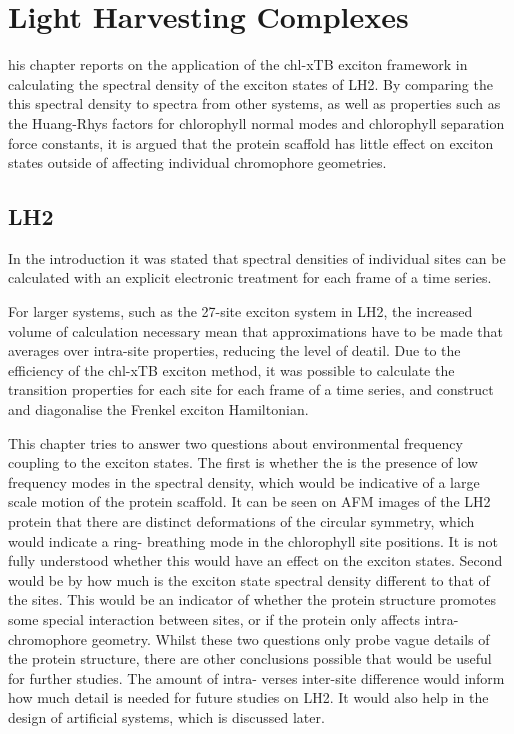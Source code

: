 %
%
\let\textcircled=\pgftextcircled
\chapter{Light Harvesting Complexes}
\label{chap:LH2}

his chapter reports on the application of the chl-xTB exciton framework
in calculating the spectral density of the exciton states of LH2. By comparing the
this spectral density to spectra from other systems, as well as properties such
as the Huang-Rhys factors for chlorophyll normal modes and chlorophyll separation
force constants, it is argued that the protein scaffold has little effect on exciton
states outside of affecting individual chromophore geometries.

\section{LH2}
\label{sec:LH2}

In the introduction it was stated that spectral densities of individual sites can
be calculated with an explicit electronic treatment for each frame of a time series.

For larger systems, such as the 27-site exciton system in LH2, the increased volume
of calculation necessary mean that approximations have to be made that averages
over intra-site properties, reducing the level of deatil. Due to the efficiency
of the chl-xTB exciton method, it was possible to calculate the transition properties
for each site for each frame of a time series, and construct and diagonalise the
Frenkel exciton Hamiltonian.

This chapter tries to answer two questions about environmental frequency coupling
to the exciton states. The first is whether the is the presence of low frequency
modes in the spectral density, which would be indicative of a large scale motion
of the protein scaffold. It can be seen on AFM images of the LH2 protein that there
are distinct deformations of the circular symmetry, which would indicate a ring-
breathing mode in the chlorophyll site positions. It is not fully understood whether
this would have an effect on the exciton states. Second would be by how much is 
the exciton state spectral density different to that of the sites. This would be
an indicator of whether the protein structure promotes some special interaction 
between sites, or if the protein only affects intra-chromophore geometry. Whilst
these two questions only probe vague details of the protein structure, there are
other conclusions possible that would be useful for further studies. The amount 
of intra- verses inter-site difference would inform how much detail is needed for
future studies on LH2. It would also help in the design of artificial systems, which
is discussed later.

